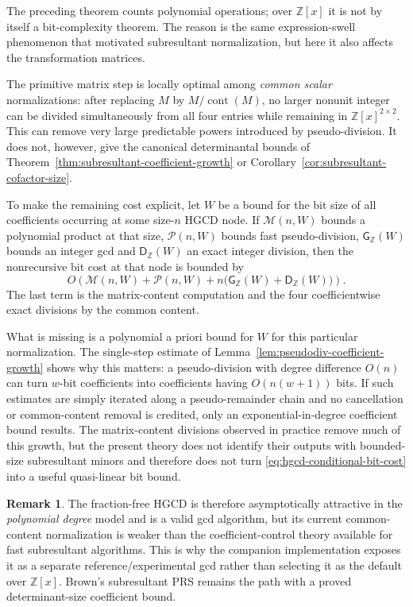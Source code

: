 \documentclass[11pt]{book}
\theoremstyle{definition}
\newtheorem{remark}[theorem]{Remark}
\newcommand{\ZZ}{\mathbb Z}
\begin{document}
The preceding theorem counts polynomial operations; over $\ZZ[x]$ it is not by
itself a bit-complexity theorem.  The reason is the same expression-swell
phenomenon that motivated subresultant normalization, but here it also affects
the transformation matrices.

The primitive matrix step is locally optimal among \emph{common scalar}
normalizations: after replacing $M$ by $M/\operatorname{cont}(M)$, no larger
nonunit integer can be divided simultaneously from all four entries while
remaining in $\ZZ[x]^{2\times2}$.  This can remove very large predictable
powers introduced by pseudo-division.  It does not, however, give the
canonical determinantal bounds of Theorem~\ref{thm:subresultant-coefficient-growth}
or Corollary~\ref{cor:subresultant-cofactor-size}.

To make the remaining cost explicit, let $W$ be a bound for the bit size of
all coefficients occurring at some size-$n$ HGCD node.  If
$\mathcal M(n,W)$ bounds a polynomial product at that size,
$\mathcal P(n,W)$ bounds fast pseudo-division, $\mathsf G_{\ZZ}(W)$ bounds an
integer gcd and $\mathsf D_{\ZZ}(W)$ an exact integer division, then the
nonrecursive bit cost at that node is bounded by
\begin{equation}\label{eq:hgcd-conditional-bit-cost}
 O\!\left(
   \mathcal M(n,W)+\mathcal P(n,W)
   +n\bigl(\mathsf G_{\ZZ}(W)+\mathsf D_{\ZZ}(W)\bigr)
  \right).
\end{equation}
The last term is the matrix-content computation and the four coefficientwise
exact divisions by the common content.

What is missing is a polynomial a priori bound for $W$ for this particular
normalization.  The single-step estimate of
Lemma~\ref{lem:pseudodiv-coefficient-growth} shows why this matters: a
pseudo-division with degree difference $O(n)$ can turn $w$-bit coefficients
into coefficients having $O(n(w+1))$ bits.  If such estimates are simply
iterated along a pseudo-remainder chain and no cancellation or common-content
removal is credited, only an exponential-in-degree coefficient bound results.
The matrix-content divisions observed in practice remove much of this growth,
but the present theory does not identify their outputs with bounded-size
subresultant minors and therefore does not turn
\eqref{eq:hgcd-conditional-bit-cost} into a useful quasi-linear bit bound.

\begin{remark}\label{rem:hgcd-experimental-status}
The fraction-free HGCD is therefore asymptotically attractive in the
\emph{polynomial degree} model and is a valid gcd algorithm, but its current
common-content normalization is weaker than the coefficient-control theory
available for fast subresultant algorithms.  This is why the companion
implementation exposes it as a separate reference/experimental gcd rather
than selecting it as the default over $\ZZ[x]$.  Brown's subresultant PRS
remains the path with a proved determinant-size coefficient bound.
\end{remark}
\end{document}

